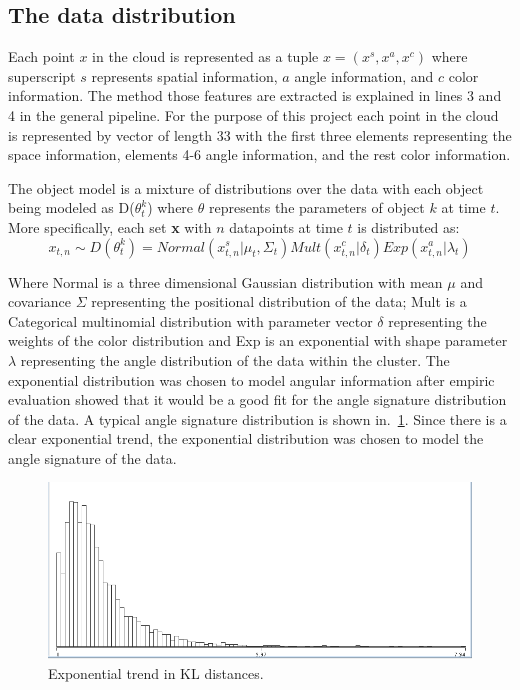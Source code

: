 \documentclass[twoside,hidelinks]{article}
\begin{document}
\subsection{The data distribution}
\label{data:dist}

Each point $x$ in the cloud is represented as a tuple $x =(x^s, x^a, x^c ) $ where superscript $s$ represents spatial information, $a$ angle information, and $c$ color information. The method those features are extracted is explained in lines 3 and 4 in the general pipeline. For the purpose of this project each point in the cloud is represented by vector of length 33 with the first three elements representing the space information, elements 4-6 angle information, and the rest color information.

The object model is a mixture of distributions over the data with each object being modeled as D($\theta_t^k$) where $\theta$ represents the parameters of object $k$ at time $t$. More specifically, each set \textbf{x} with $n$ datapoints at time $t$ is distributed as:
$$ x_{t,n} \sim D(\theta_t^k) = Normal(x_{t,n}^s| \mu_t, \Sigma_t) Mult(x_{t,n}^c | \delta_t) Exp(x_{t,n}^a | \lambda_t) $$

Where Normal is a three dimensional Gaussian distribution with mean $\mu$ and covariance $\Sigma$ representing the positional distribution of the data; Mult is a Categorical multinomial distribution with parameter vector $\delta$ representing the weights of the color distribution and Exp is an exponential with shape parameter $\lambda$ representing the angle distribution of the data within the cluster. The exponential distribution was chosen to model angular information after empiric evaluation showed that it would be a good fit for the angle signature distribution of the data. A typical angle signature distribution is shown in.~\ref{pcl:kl}. Since there is a clear exponential trend, the exponential distribution was chosen to model the angle signature of the data.

\begin{figure}[h!]
  \centering
    \includegraphics[width=.5\textwidth]{Kullback-Leibler}
    \caption{Exponential trend in KL distances.}
  \label{pcl:kl}
\end{figure}
\end{document}
